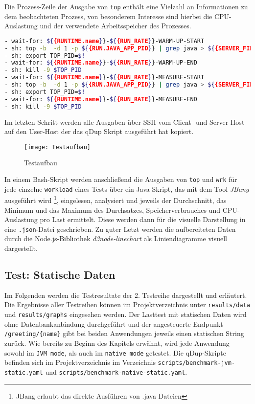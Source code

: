 Die Prozess-Zeile der Ausgabe von \verb|top| enthält eine Vielzahl an Informationen zu dem beobachteten Prozess, von besonderem
Interesse sind hierbei die CPU-Auslastung und der verwendete Arbeitsspeicher des Prozesses. \parencite{linuxTopManual}

\begin{lstlisting}[language=sh, caption=Auszug des qDup Skripts capture-platform-stats, captionpos=b]
- wait-for: ${{RUNTIME.name}}-${{RUN_RATE}}-WARM-UP-START
- sh: top -b  -d 1 -p ${{RUN.JAVA_APP_PID}} | grep java > ${{SERVER_FILE_PATH}}/output/${{RUNTIME.name}}-${{RUN_RATE}}-WARM-UP-top.out &
- sh: export TOP_PID=$!
- wait-for: ${{RUNTIME.name}}-${{RUN_RATE}}-WARM-UP-END
- sh: kill -9 $TOP_PID
- wait-for: ${{RUNTIME.name}}-${{RUN_RATE}}-MEASURE-START
- sh: top -b  -d 1 -p ${{RUN.JAVA_APP_PID}} | grep java > ${{SERVER_FILE_PATH}}/output/${{RUNTIME.name}}-${{RUN_RATE}}-MEASURE-top.out &
- sh: export TOP_PID=$!
- wait-for: ${{RUNTIME.name}}-${{RUN_RATE}}-MEASURE-END
- sh: kill -9 $TOP_PID
  \end{lstlisting}

Im letzten Schritt werden alle Ausgaben über SSH vom Client- und Server-Host auf den User-Host der das qDup Skript ausgeführt hat kopiert.

\begin{figure}[ht]
    \centering
    \texttt{[image: Testaufbau]}
    \caption{Testaufbau}
\end{figure}

In einem Bash-Skript werden anschließend die Ausgaben von \verb|top| und \verb|wrk| für jede einzelne \verb|workload| eines Tests
über ein Java-Skript, das mit dem Tool \textit{JBang} ausgeführt wird \footnote{JBang erlaubt das direkte Ausführen von .java Dateien},
eingelesen, analysiert und jeweils der Durchschnitt, das Minimum und das Maximum des Durchsatzes, Speicherverbrauches und CPU-Auslastung pro Last ermittelt.
Diese werden dann für die visuelle Darstellung in eine \verb|.json|-Datei geschrieben.
Zu guter Letzt werden die aufbereiteten Daten durch die Node.js-Bibliothek \textit{d3node-linechart} als Liniendiagramme visuell dargestellt.

\subsection{Test: Statische Daten}
\label{section:statische_daten}
Im Folgenden werden die Testresultate der 2. Testreihe dargestellt und erläutert.
Die Ergebnisse aller Testreihen können im Projektverzeichnis unter \verb|results/data| und \verb|results/graphs| eingesehen werden.
Der Lasttest mit statischen Daten wird ohne Datenbankanbindung durchgeführt und der angesteuerte Endpunkt \verb|/greeting/{name}| gibt bei beiden Anwendungen
jeweils einen statischen String zurück. Wie bereits zu Beginn des Kapitels erwähnt, wird jede Anwendung sowohl im \verb|JVM mode|, als auch im
\verb|native mode| getestet.
Die qDup-Skripte befinden sich im Projektverzeichnis im Verzeichnis \verb|scripts/benchmark-jvm-static.yaml| und
\verb|scripts/benchmark-native-static.yaml|.

